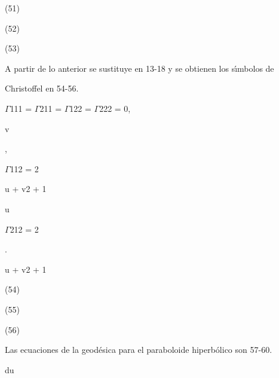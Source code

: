 \documentclass[a4paper,portrait,12pt]{article}
\begin{document}
(51)


(52)


(53)





\begin{flushleft}
A partir de lo anterior se sustituye en 13-18 y se obtienen los s\i{}́mbolos de
\end{flushleft}


\begin{flushleft}
Christoffel en 54-56.
\end{flushleft}





\begin{flushleft}
\newpage
$\Gamma$111 = $\Gamma$211 = $\Gamma$122 = $\Gamma$222 = 0,
\end{flushleft}


\begin{flushleft}
v
\end{flushleft}


,


\begin{flushleft}
$\Gamma$112 = 2
\end{flushleft}


\begin{flushleft}
u + v2 + 1
\end{flushleft}


\begin{flushleft}
u
\end{flushleft}


\begin{flushleft}
$\Gamma$212 = 2
\end{flushleft}


.


\begin{flushleft}
u + v2 + 1
\end{flushleft}





(54)


(55)


(56)





\begin{flushleft}
Las ecuaciones de la geodésica para el paraboloide hiperbólico son 57-60.
\end{flushleft}


\begin{flushleft}
du
\end{flushleft}
\end{document}
